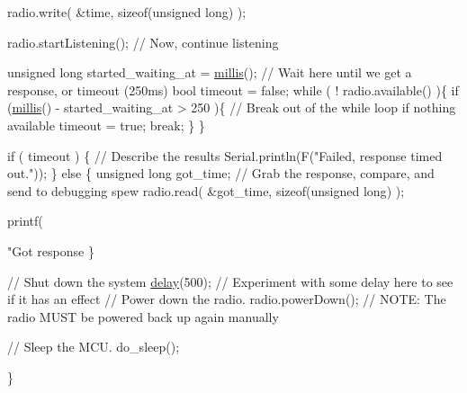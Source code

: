 \begin{DoxyCodeInclude}
    radio.write( &time, \textcolor{keyword}{sizeof}(\textcolor{keywordtype}{unsigned} \textcolor{keywordtype}{long}) );

    radio.startListening();                         \textcolor{comment}{// Now, continue listening}
    
    \textcolor{keywordtype}{unsigned} \textcolor{keywordtype}{long} started\_waiting\_at = \hyperlink{group__Porting__General_gad5b3ec1ce839fa1c4337a7d0312e9749}{millis}();    \textcolor{comment}{// Wait here until we get a response, or timeout
       (250ms)}
    \textcolor{keywordtype}{bool} timeout = \textcolor{keyword}{false};
    \textcolor{keywordflow}{while} ( ! radio.available()  )\{
        \textcolor{keywordflow}{if} (\hyperlink{group__Porting__General_gad5b3ec1ce839fa1c4337a7d0312e9749}{millis}() - started\_waiting\_at > 250 )\{  \textcolor{comment}{// Break out of the while loop if nothing
       available}
          timeout = \textcolor{keyword}{true};
          \textcolor{keywordflow}{break};
        \}
    \}
    
    \textcolor{keywordflow}{if} ( timeout ) \{                                \textcolor{comment}{// Describe the results}
        Serial.println(F(\textcolor{stringliteral}{"Failed, response timed out."}));
    \} \textcolor{keywordflow}{else} \{
        \textcolor{keywordtype}{unsigned} \textcolor{keywordtype}{long} got\_time;                     \textcolor{comment}{// Grab the response, compare, and send to debugging
       spew}
        radio.read( &got\_time, \textcolor{keyword}{sizeof}(\textcolor{keywordtype}{unsigned} \textcolor{keywordtype}{long}) );
    
        printf(\textcolor{stringliteral}{"Got response %
    \}

    \textcolor{comment}{// Shut down the system}
    \hyperlink{group__Porting__General_ga70a331e8ddf9acf9d33c47b71cda4c5f}{delay}(500);                     \textcolor{comment}{// Experiment with some delay here to see if it has an effect}
                                    \textcolor{comment}{// Power down the radio.  }
    radio.powerDown();              \textcolor{comment}{// NOTE: The radio MUST be powered back up again manually}

                                    \textcolor{comment}{// Sleep the MCU.}
      do\_sleep();


  \}


}
\end{DoxyCodeInclude}
